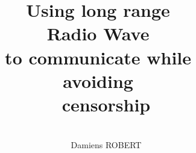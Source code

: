 \documentclass{article}
\title{Using long range
~\\
Radio Wave
~\\
to communicate while
~\\
avoiding
~\\
censorship
}
\date{
~\\
}
\author{
~\\
Damiens ROBERT
}
\begin{document}
  \maketitle
  \section{}
\end{document}
